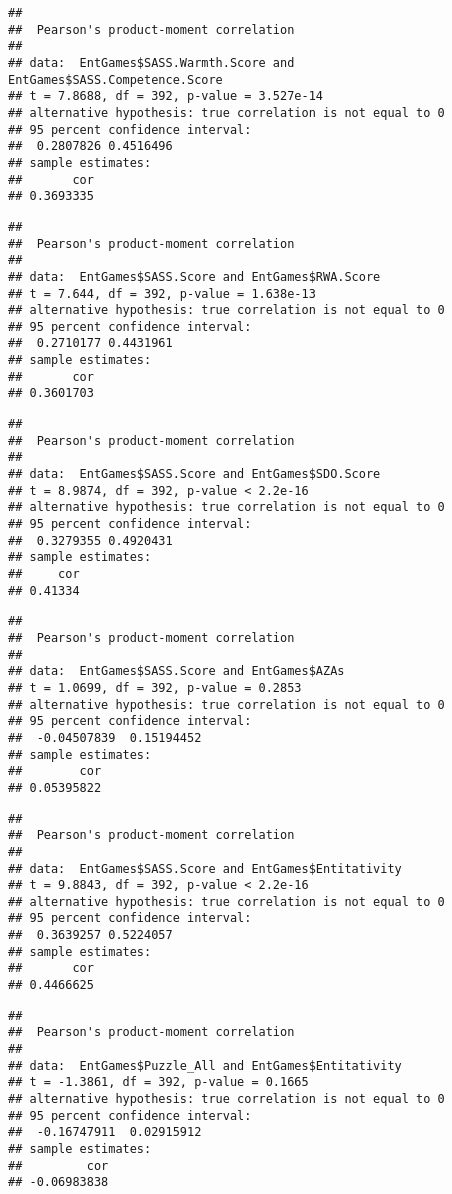 \documentclass[
  doc,draftall]{apa6}
\begin{document}
\begin{verbatim}
## 
##  Pearson's product-moment correlation
## 
## data:  EntGames$SASS.Warmth.Score and EntGames$SASS.Competence.Score
## t = 7.8688, df = 392, p-value = 3.527e-14
## alternative hypothesis: true correlation is not equal to 0
## 95 percent confidence interval:
##  0.2807826 0.4516496
## sample estimates:
##       cor 
## 0.3693335
\end{verbatim}

\begin{verbatim}
## 
##  Pearson's product-moment correlation
## 
## data:  EntGames$SASS.Score and EntGames$RWA.Score
## t = 7.644, df = 392, p-value = 1.638e-13
## alternative hypothesis: true correlation is not equal to 0
## 95 percent confidence interval:
##  0.2710177 0.4431961
## sample estimates:
##       cor 
## 0.3601703
\end{verbatim}

\begin{verbatim}
## 
##  Pearson's product-moment correlation
## 
## data:  EntGames$SASS.Score and EntGames$SDO.Score
## t = 8.9874, df = 392, p-value < 2.2e-16
## alternative hypothesis: true correlation is not equal to 0
## 95 percent confidence interval:
##  0.3279355 0.4920431
## sample estimates:
##     cor 
## 0.41334
\end{verbatim}

\begin{verbatim}
## 
##  Pearson's product-moment correlation
## 
## data:  EntGames$SASS.Score and EntGames$AZAs
## t = 1.0699, df = 392, p-value = 0.2853
## alternative hypothesis: true correlation is not equal to 0
## 95 percent confidence interval:
##  -0.04507839  0.15194452
## sample estimates:
##        cor 
## 0.05395822
\end{verbatim}

\begin{verbatim}
## 
##  Pearson's product-moment correlation
## 
## data:  EntGames$SASS.Score and EntGames$Entitativity
## t = 9.8843, df = 392, p-value < 2.2e-16
## alternative hypothesis: true correlation is not equal to 0
## 95 percent confidence interval:
##  0.3639257 0.5224057
## sample estimates:
##       cor 
## 0.4466625
\end{verbatim}

\begin{verbatim}
## 
##  Pearson's product-moment correlation
## 
## data:  EntGames$Puzzle_All and EntGames$Entitativity
## t = -1.3861, df = 392, p-value = 0.1665
## alternative hypothesis: true correlation is not equal to 0
## 95 percent confidence interval:
##  -0.16747911  0.02915912
## sample estimates:
##         cor 
## -0.06983838
\end{verbatim}
\end{document}
